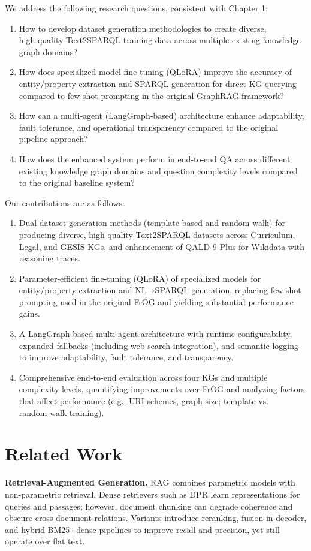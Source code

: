 \documentclass[12pt,a4paper,onecolumn]{article}
\begin{document}
We address the following research questions, consistent with Chapter 1:
\begin{enumerate}[leftmargin=*, label=RQ\arabic*:, itemsep=0.3\baselineskip]
  \item How to develop dataset generation methodologies to create diverse, high‑quality Text2SPARQL training data across multiple existing knowledge graph domains?
  \item How does specialized model fine‑tuning (QLoRA) improve the accuracy of entity/property extraction and SPARQL generation for direct KG querying compared to few‑shot prompting in the original GraphRAG framework?
  \item How can a multi‑agent (LangGraph‑based) architecture enhance adaptability, fault tolerance, and operational transparency compared to the original pipeline approach?
  \item How does the enhanced system perform in end‑to‑end QA across different existing knowledge graph domains and question complexity levels compared to the original baseline system?
\end{enumerate}

Our contributions are as follows:
\begin{enumerate}[leftmargin=*, label=C\arabic*), itemsep=0.3\baselineskip]
  \item Dual dataset generation methods (template‑based and random‑walk) for producing diverse, high‑quality Text2SPARQL datasets across Curriculum, Legal, and GESIS KGs, and enhancement of QALD‑9‑Plus for Wikidata with reasoning traces.
  \item Parameter‑efficient fine‑tuning (QLoRA) of specialized models for entity/property extraction and NL→SPARQL generation, replacing few‑shot prompting used in the original FrOG and yielding substantial performance gains.
  \item A LangGraph‑based multi‑agent architecture with runtime configurability, expanded fallbacks (including web search integration), and semantic logging to improve adaptability, fault tolerance, and transparency.
  \item Comprehensive end‑to‑end evaluation across four KGs and multiple complexity levels, quantifying improvements over FrOG and analyzing factors that affect performance (e.g., URI schemes, graph size; template vs. random‑walk training).
\end{enumerate}

\section*{Related Work}
\textbf{Retrieval-Augmented Generation.} RAG combines parametric models with non-parametric retrieval. Dense retrievers such as DPR learn representations for queries and passages; however, document chunking can degrade coherence and obscure cross-document relations. Variants introduce reranking, fusion-in-decoder, and hybrid BM25+dense pipelines to improve recall and precision, yet still operate over flat text.
\end{document}
